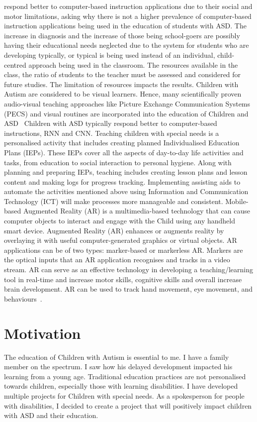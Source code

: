respond better to computer-based instruction applications due to their social and motor limitations, asking why there is not a higher prevalence of computer-based instruction applications being used in the education of students with ASD. The increase in diagnosis and the increase of those being school-goers are possibly having their educational needs neglected due to the system for students who are developing typically, or typical is being used instead of an individual, child-centred approach being used in the classroom. The resources available in the class, the ratio of students to the teacher must be assessed and considered for future studies. The limitation of resources impacts the results. Children with Autism are considered to be visual learners. Hence, many scientifically proven audio-visual teaching approaches like Picture Exchange Communication Systems (PECS) and visual routines are incorporated into the education of Children and ASD~\cite{Reference4} Children with ASD typically respond better to computer-based instructions, RNN and CNN. Teaching children with special needs is a personalised activity that includes creating planned Individualised Education Plans (IEPs). These IEPs cover all the aspects of day-to-day life activities and tasks, from education to social interaction to personal hygiene. Along with planning and preparing IEPs, teaching includes creating lesson plans and lesson content and making logs for progress tracking. Implementing assisting aids to automate the activities mentioned above using Information and Communication Technology (ICT) will make processes more manageable and consistent. Mobile-based Augmented Reality (AR) is a multimedia-based technology that can cause computer objects to interact and engage with the Child using any handheld smart device. Augmented Reality (AR) enhances or augments reality by overlaying it with useful computer-generated graphics or virtual objects. AR applications can be of two types: marker-based or markerless AR. Markers are the optical inputs that an AR application recognises and tracks in a video stream.
AR can serve as an effective technology in developing a teaching/learning tool in real-time and increase motor skills, cognitive skills and overall increase brain development. AR can be used to track hand movement, eye movement, and behaviours~\cite{Reference5}.

\section{Motivation}
The education of Children with Autism is essential to me. I have a family member on the spectrum. I saw how his delayed development impacted his learning from a young age. Traditional education practices are not personalised towards children, especially those with learning disabilities. I have developed multiple projects for Children with special needs. As a spokesperson for people with disabilities, I decided to create a project that will positively impact children with ASD and their education.

